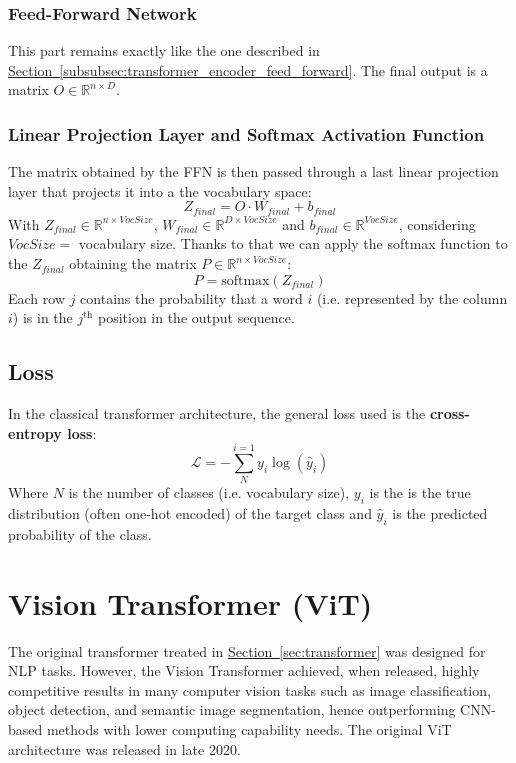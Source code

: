 \documentclass[12pt]{article}
\begin{document}
\subsubsection{Feed-Forward Network}
This part remains exactly like the one described in \hyperref[subsubsec:transformer_encoder_feed_forward]{Section~\ref*{subsubsec:transformer_encoder_feed_forward}}.
The final output is a matrix $O \in \mathbb{R}^{n \times D}$.

\subsubsection{Linear Projection Layer and Softmax Activation Function}
The matrix obtained by the FFN is then passed through a last linear projection layer that projects it into a the 
vocabulary space:
\begin{equation}
    Z_{final} = O \cdot W_{final} + b_{final}
\end{equation}
With $Z_{final} \in \mathbb{R}^{n \times {VocSize}}$, $W_{final} \in \mathbb{R}^{D \times {VocSize}}$ and 
$b_{final} \in \mathbb{R}^{VocSize}$, considering $VocSize = $ vocabulary size. 
Thanks to that we can apply the softmax function to the $Z_{final}$ obtaining the matrix $P \in \mathbb{R}^{n \times {VocSize}}$:
\begin{equation}
    P = \text{softmax}(Z_{final})
\end{equation}
Each row $j$ contains the probability that a word $i$ (i.e. represented by the column $i$) is in the $j^{\text{th}}$
position in the output sequence.

\subsection{Loss}
\label{subsec:transformer_loss}
In the classical transformer architecture, the general loss used is the \textbf{cross-entropy loss}:
\begin{equation}
    \mathcal{L} = - \sum_{N}^{i=1} y_i \log (\hat{y}_i)
\end{equation}
Where $N$ is the number of classes (i.e. vocabulary size), $y_i$ is the is the true distribution (often one-hot encoded) of the target class
and $\hat{y}_i$ is the predicted probability of the class. 




\section{Vision Transformer (ViT)}
The original transformer treated in \hyperref[sec:transformer]{Section~\ref*{sec:transformer}} was designed 
for NLP tasks. However, the Vision Transformer achieved, when released, highly competitive results in many 
computer vision tasks such as image classification, object detection, and semantic image segmentation, hence 
outperforming CNN-based methods with lower computing capability needs.
The original ViT architecture was released in late 2020.
\end{document}
